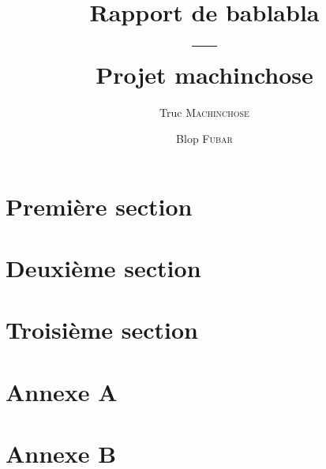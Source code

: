 \documentclass[a4paper,11pt,french]{article}
\title{Rapport de bablabla\\---\\Projet machinchose}
\author{Truc \textsc{Machinchose} \and Blop \textsc{Fubar}}
\begin{document}
\maketitle

\tableofcontents
\newpage

\section{Première section}
\section{Deuxième section}
\section{Troisième section}
\newpage
\appendix
\section{Annexe A}
\section{Annexe B}
\end{document}
